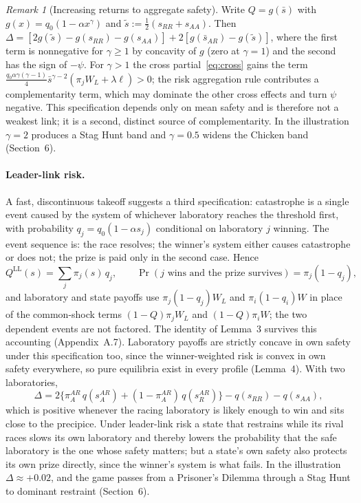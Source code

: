\documentclass[11pt]{article}
\theoremstyle{plain}
\theoremstyle{definition}
\theoremstyle{remark}
\newtheorem{remark}{Remark}
\newcommand{\WL}{W_{\!L}}
\newcommand{\Sh}{\bar s}
\newcommand{\Delt}{\Delta}
\begin{document}
\begin{remark}[Increasing returns to aggregate safety]
Write $Q=g(\Sh)$ with $g(x)=q_0(1-\alpha x^{\gamma})$ and $\tilde s:=\tfrac12(s_{RR}+s_{AA})$. Then $\Delt=[2g(\tilde s)-g(s_{RR})-g(s_{AA})]+2[g(\Sh_{AR})-g(\tilde s)]$, where the first term is nonnegative for $\gamma\ge1$ by concavity of $g$ (zero at $\gamma=1$) and the second has the sign of $-\psi$. For $\gamma>1$ the cross partial~\eqref{eq:cross} gains the term $\tfrac{q_0\alpha\gamma(\gamma-1)}{4}\Sh^{\gamma-2}(\pi_j\WL+\lambda\ell)>0$; the risk aggregation rule contributes a complementarity term, which may dominate the other cross effects and turn $\psi$ negative. This specification depends only on mean safety and is therefore not a weakest link; it is a second, distinct source of complementarity. In the illustration $\gamma=2$ produces a Stag Hunt band and $\gamma=0.5$ widens the Chicken band (Section~6).
\end{remark}

\paragraph{Leader-link risk.} A fast, discontinuous takeoff suggests a third specification: catastrophe is a single event caused by the system of whichever laboratory reaches the threshold first, with probability $q_j=q_0(1-\alpha s_j)$ conditional on laboratory $j$ winning. The event sequence is: the race resolves; the winner's system either causes catastrophe or does not; the prize is paid only in the second case. Hence
\begin{equation}
Q^{\mathrm{LL}}(s)=\sum_j \pi_j(s)\,q_j,\qquad \Pr(j\text{ wins and the prize survives})=\pi_j(1-q_j),
\label{eq:ll}
\end{equation}
and laboratory and state payoffs use $\pi_j(1-q_j)\WL$ and $\pi_i(1-q_i)W$ in place of the common-shock terms $(1-Q)\pi_j\WL$ and $(1-Q)\pi_iW$; the two dependent events are not factored. The identity of Lemma~3 survives this accounting (Appendix~A.7). Laboratory payoffs are strictly concave in own safety under this specification too, since the winner-weighted risk is convex in own safety everywhere, so pure equilibria exist in every profile (Lemma~4). With two laboratories,
\[
\Delt=2\bigl\{\pi^{AR}_A\,q(s^{AR}_A)+(1-\pi^{AR}_A)\,q(s^{AR}_R)\bigr\}-q(s_{RR})-q(s_{AA}),
\]
which is positive whenever the racing laboratory is likely enough to win and sits close to the precipice. Under leader-link risk a state that restrains while its rival races slows its own laboratory and thereby lowers the probability that the safe laboratory is the one whose safety matters; but a state's own safety also protects its own prize directly, since the winner's system is what fails. In the illustration $\Delt\approx+0.02$, and the game passes from a Prisoner's Dilemma through a Stag Hunt to dominant restraint (Section~6).
\end{document}
